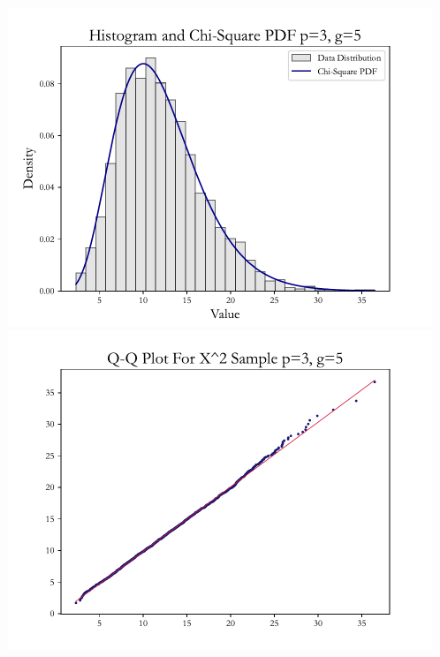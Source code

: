 \documentclass{article} %
\begin{document}
\begin{figure}[H]
\begin{minipage}[b]{0.49\textwidth}
    \end{minipage}
    \hfill
    \begin{minipage}[b]{0.49\textwidth}
        \centering
        \includegraphics[width=\textwidth]{img/b/hist_plot_p=3_g=5.pdf}
    \end{minipage}
    \hfill
    \begin{minipage}[b]{0.49\textwidth}
        \centering
        \includegraphics[width=\textwidth]{img/b/qq_plot_p=3_g=5.pdf}
    \end{minipage}
    

\end{figure}
\end{document}
